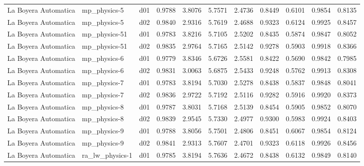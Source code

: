 \begin{longtable}{lllrrrrrrrr}
 La Boyera Automatica  &          mp\_physics-5 &     d01 &   0.9788 &   3.8076 &   5.7571 &       2.4736 &        0.8449 &       0.6101 &           0.9854 &  0.8135 \\
 La Boyera Automatica  &          mp\_physics-5 &     d02 &   0.9840 &   2.9316 &   5.7619 &       2.4688 &        0.9323 &       0.6124 &           0.9925 &  0.8457 \\
 La Boyera Automatica  &         mp\_physics-51 &     d01 &   0.9783 &   3.8216 &   5.7105 &       2.5202 &        0.8435 &       0.5874 &           0.9847 &  0.8052 \\
 La Boyera Automatica  &         mp\_physics-51 &     d02 &   0.9835 &   2.9764 &   5.7165 &       2.5142 &        0.9278 &       0.5903 &           0.9918 &  0.8366 \\
 La Boyera Automatica  &          mp\_physics-6 &     d01 &   0.9779 &   3.8346 &   5.6726 &       2.5581 &        0.8422 &       0.5690 &           0.9842 &  0.7985 \\
 La Boyera Automatica  &          mp\_physics-6 &     d02 &   0.9831 &   3.0063 &   5.6875 &       2.5433 &        0.9248 &       0.5762 &           0.9913 &  0.8308 \\
 La Boyera Automatica  &          mp\_physics-7 &     d01 &   0.9783 &   3.8194 &   5.7030 &       2.5278 &        0.8438 &       0.5837 &           0.9848 &  0.8041 \\
 La Boyera Automatica  &          mp\_physics-7 &     d02 &   0.9836 &   2.9722 &   5.7192 &       2.5116 &        0.9282 &       0.5916 &           0.9920 &  0.8373 \\
 La Boyera Automatica  &          mp\_physics-8 &     d01 &   0.9787 &   3.8031 &   5.7168 &       2.5139 &        0.8454 &       0.5905 &           0.9852 &  0.8070 \\
 La Boyera Automatica  &          mp\_physics-8 &     d02 &   0.9839 &   2.9545 &   5.7330 &       2.4977 &        0.9300 &       0.5983 &           0.9924 &  0.8403 \\
 La Boyera Automatica  &          mp\_physics-9 &     d01 &   0.9788 &   3.8056 &   5.7501 &       2.4806 &        0.8451 &       0.6067 &           0.9854 &  0.8124 \\
 La Boyera Automatica  &          mp\_physics-9 &     d02 &   0.9841 &   2.9313 &   5.7607 &       2.4701 &        0.9323 &       0.6118 &           0.9926 &  0.8456 \\
 La Boyera Automatica  &       ra\_lw\_physics-1 &     d01 &   0.9785 &   3.8194 &   5.7636 &       2.4672 &        0.8438 &       0.6132 &           0.9849 &  0.8140 \\

\end{longtable}

